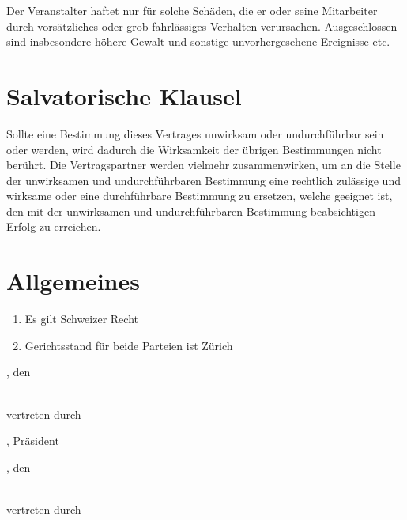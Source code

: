 Der Veranstalter haftet nur für solche Schäden, die er oder seine Mitarbeiter durch vorsätzliches oder grob fahrlässiges Verhalten verursachen. Ausgeschlossen sind insbesondere höhere Gewalt und sonstige unvorhergesehene Ereignisse etc. 


\section{Salvatorische Klausel}

Sollte eine Bestimmung dieses Vertrages unwirksam oder undurchführbar sein oder werden, wird dadurch die Wirksamkeit der übrigen Bestimmungen nicht berührt. Die Vertragspartner werden vielmehr zusammenwirken, um an die Stelle der unwirksamen und undurchführbaren Bestimmung eine rechtlich zulässige und wirksame oder eine durchführbare Bestimmung zu ersetzen, welche geeignet ist, den mit der unwirksamen und undurchführbaren Bestimmung beabsichtigen Erfolg zu erreichen. 

\section{Allgemeines}
\begin{enumerate}
\item Es gilt Schweizer Recht
\item Gerichtsstand für beide Parteien ist Zürich
\end{enumerate}

\vfill
\noindent
\begin{minipage}[t]{0.45\textwidth}
\amivcity, den \hrulefill

\bigskip\noindent
\amivname\\
vertreten durch

\vspace{4em}
\hrulefill

\amivsectionpresident

\amivsectionname , Präsident
\end{minipage}%
\hspace{0.1\textwidth}
\begin{minipage}[t]{0.45\textwidth}
\makebox[8em]{\hrulefill}, den \hrulefill

\bigskip\noindent
\companyname\\
vertreten durch

\vspace{4em}
\hrulefill

\companyrepresentative\\

\end{minipage}
